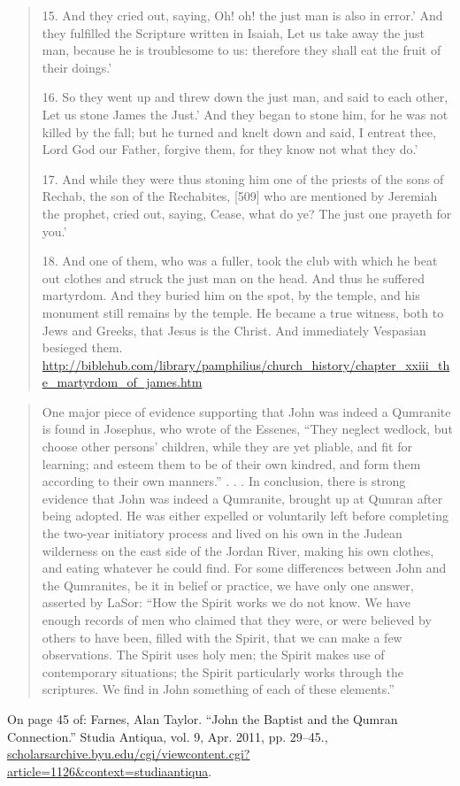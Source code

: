 \documentclass[11pt]{article}
\begin{document}
\begin{thebibliography}{37}
\begin{quote}
15. And they cried out, saying, Oh! oh! the just man is also in error.' And they fulfilled the Scripture written in Isaiah, Let us take away the just man, because he is troublesome to us: therefore they shall eat the fruit of their doings.'

16. So they went up and threw down the just man, and said to each other, Let us stone James the Just.' And they began to stone him, for he was not killed by the fall; but he turned and knelt down and said, I entreat thee, Lord God our Father, forgive them, for they know not what they do.'

17. And while they were thus stoning him one of the priests of the sons of Rechab, the son of the Rechabites, [509] who are mentioned by Jeremiah the prophet, cried out, saying, Cease, what do ye? The just one prayeth for you.'

18. And one of them, who was a fuller, took the club with which he beat out clothes and struck the just man on the head. And thus he suffered martyrdom. And they buried him on the spot, by the temple, and his monument still remains by the temple. He became a true witness, both to Jews and Greeks, that Jesus is the Christ. And immediately Vespasian besieged them.
\url{http://biblehub.com/library/pamphilius/church_history/chapter_xxiii_the_martyrdom_of_james.htm}
\end{quote}

\begin{quote}
One major piece of evidence supporting that John was indeed a
Qumranite is found in Josephus, who wrote of the Essenes, “They neglect
wedlock, but choose other persons’ children, while they are yet pliable, and
fit for learning; and esteem them to be of their own kindred, and form them
according to their own manners.”
. . .
In conclusion, there is strong evidence that John was indeed a Qumranite,
brought up at Qumran after being adopted. He was either expelled or
voluntarily left before completing the two-year initiatory process and lived on
his own in the Judean wilderness on the east side of the Jordan River, making
his own clothes, and eating whatever he could find. For some differences
between John and the Qumranites, be it in belief or practice, we have only
one answer, asserted by LaSor: “How the Spirit works we do not know. We
have enough records of men who claimed that they were, or were believed by
others to have been, filled with the Spirit, that we can make a few observations.
The Spirit uses holy men; the Spirit makes use of contemporary situations; the
Spirit particularly works through the scriptures. We find in John something of
each of these elements.”
\end{quote}
On page 45 of: Farnes, Alan Taylor. “John the Baptist and the Qumran Connection.” Studia Antiqua, vol. 9, Apr. 2011, pp. 29–45., \url{scholarsarchive.byu.edu/cgi/viewcontent.cgi?article=1126&context=studiaantiqua}.


\end{thebibliography}
\end{document}
